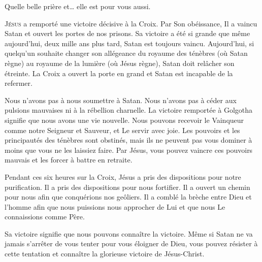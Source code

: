 Quelle belle prière et\dots{} elle est pour vous aussi.

\dvrule







\lettrine{J}{ésus} a remporté une victoire décisive à la Croix.
 Par Son obéissance, Il a vaincu Satan et ouvert les portes de nos prisons.
 Sa victoire a été si grande que même aujourd'hui, deux mille ans plus tard,
 Satan est toujours vaincu. Aujourd'hui, si quelqu'un souhaite changer
 son allégeance du royaume des ténèbres (où Satan règne)
 au royaume de la lumière (où Jésus règne),
 Satan doit relâcher son étreinte.
 La Croix  a ouvert la porte en grand
 \ocadr et Satan est incapable de la refermer.


Nous n'avons pas à nous soumettre à Satan. Nous n'avons pas à céder
 aux pulsions mauvaises ni à la rébellion charnelle.
 La victoire remportée à Golgotha  signifie que
 nous avons une vie nouvelle. Nous pouvons recevoir le Vainqueur
 comme notre Seigneur et Sauveur, et Le servir avec joie.
 Les pouvoirs et les principautés des ténèbres sont obstinés,
 mais ils ne peuvent pas vous dominer à moins que vous ne les laissiez faire.
 Par Jésus, vous pouvez vaincre ces pouvoirs mauvais et les forcer
 à battre en retraite.

Pendant ces six heures sur la Croix, Jésus a pris des dispositions
 pour notre purification. Il a pris des dispositions pour nous fortifier.
 Il a ouvert un chemin pour nous afin que conquérions nos geôliers.
 Il a comblé la brèche entre Dieu et l'homme afin que nous puissions
 nous approcher de Lui et que nous Le connaissions comme Père.

Sa victoire signifie que nous pouvons connaître la victoire.
 Même si Satan ne va jamais s'arrêter de vous tenter pour vous éloigner
 de Dieu, vous pouvez résister à cette tentation et connaître
 la glorieuse victoire de Jésus-Christ. 

